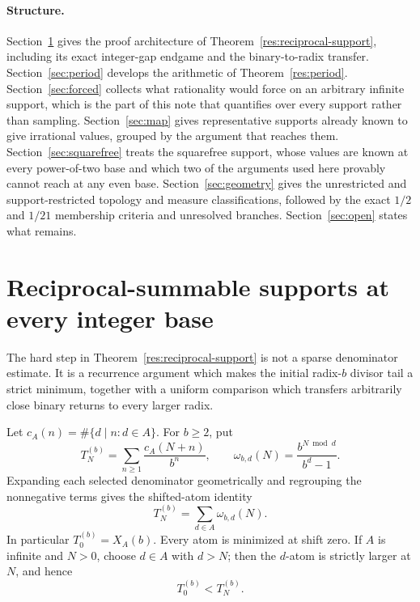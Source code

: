 \documentclass[11pt]{article}
\begin{document}
\statusboundary

\paragraph{Structure.}
Section~\ref{sec:reciprocal-support} gives the proof architecture of
Theorem~\ref{res:reciprocal-support}, including its exact integer-gap
endgame and the binary-to-radix transfer.  Section~\ref{sec:period} develops the arithmetic of
Theorem~\ref{res:period}.  Section~\ref{sec:forced} collects what
rationality would force on an arbitrary infinite support, which is the part of
this note that quantifies over every support rather than sampling.
Section~\ref{sec:map} gives representative supports already known to give
irrational values, grouped by the argument that reaches them.
Section~\ref{sec:squarefree} treats
the squarefree support, whose values are known at every power-of-two base and which two of the
arguments used here provably cannot reach at any even base.
Section~\ref{sec:geometry} gives the unrestricted and support-restricted
topology and measure classifications, followed by the exact $1/2$ and $1/21$
membership criteria and unresolved branches.  Section~\ref{sec:open} states
what remains.

\section{Reciprocal-summable supports at every integer base}
\label{sec:reciprocal-support}

The hard step in Theorem~\ref{res:reciprocal-support} is not a sparse
denominator estimate.  It is a recurrence argument which makes the initial
radix-\(b\) divisor tail a strict minimum, together with a uniform comparison
which transfers arbitrarily close binary returns to every larger radix.

Let \(c_A(n)=\#\{d\mid n:d\in A\}\).  For \(b\ge2\), put
\[
 T_N^{(b)}=\sum_{n\ge1}\frac{c_A(N+n)}{b^n},
 \qquad
 \omega_{b,d}(N)=\frac{b^{N\bmod d}}{b^d-1}.
\]
Expanding each selected denominator geometrically and regrouping the
nonnegative terms gives the shifted-atom identity
\[
 T_N^{(b)}=\sum_{d\in A}\omega_{b,d}(N).
 \tag{2}\label{eq:shifted-support-atoms}
\]
In particular \(T_0^{(b)}=X_A(b)\).  Every atom is minimized at shift zero.
If \(A\) is infinite and \(N>0\), choose \(d\in A\) with \(d>N\); then the
\(d\)-atom is strictly larger at \(N\), and hence
\[
 T_0^{(b)}<T_N^{(b)}. \tag{3}\label{eq:strict-initial-minimum}
\]
\end{document}
